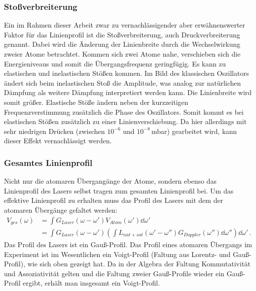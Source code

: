 \subsubsection{Stoßverbreiterung}\label{subsubsec:stossverbreiterung}
Ein im Rahmen dieser Arbeit zwar zu vernachlässigender aber erwähnenswerter
Faktor für das Linienprofil ist die Stoßverbreiterung, auch
Druckverbreiterung genannt. Dabei wird die Änderung der Linienbreite durch die
Wechselwirkung zweier Atome betrachtet. Kommen sich zwei Atome nahe, verschieben
sich die Energieniveaus und somit die Übergangsfrequenz geringfügig. Es kann zu
elastischen und inelastischen Stößen kommen. Im Bild des klassischen Oszillators
ändert sich beim inelastischen Stoß die Amplitude, was analog zur natürlichen
Dämpfung als weitere Dämpfung interpretiert werden kann. Die Linienbreite wird
somit größer. Elastische Stöße ändern neben der kurzzeitigen Frequenzverstimmung
zusätzlich die Phase des Oszillators. Somit kommt es bei elastischen Stößen
zusätzlich zu einer Linienverschiebung. Da hier allerdings mit
sehr niedrigen Drücken (zwischen $10^{-6}$ und $10^{-8}\,$mbar) gearbeitet wird, kann dieser Effekt vernachlässigt werden.

\subsubsection{Gesamtes Linienprofil}\label{subsubsec:ges-linienprofil}
Nicht nur die atomaren Übergangänge der Atome, sondern ebenso das Linienprofil
des Lasers selbst tragen zum gesamten Linienprofil bei. Um das effektive
Linienprofil zu erhalten muss das Profil des Lasers mit dem der atomaren
Übergänge gefaltet werden:
\begin{equation}\label{eq:voigt}
	\begin{split}
		V_{ges}(\omega)
		&=\int{G_{Laser}(\omega-\omega')V_{Atom}(\omega')\dd\omega'}\\
		&=\int{G_{Laser}(\omega-\omega')\left(\int{L_{nat+sat}(\omega'-\omega'')G_{Doppler}(\omega'')\dd\omega''}\right)\dd\omega'}\,.
	\end{split}
\end{equation}
Das Profil des Lasers ist ein Gauß-Profil. Das Profil eines atomaren Übergangs
im Experiment ist im Wesentlichen ein Voigt-Profil (Faltung aus Lorentz- und
Gauß-Profil), wie sich oben gezeigt hat. Da in der Algebra der Faltung
Kommutativität und Assoziativität gelten und die Faltung zweier Gauß-Profile
wieder ein Gauß-Profil ergibt, erhält man insgesamt ein Voigt-Profil.

